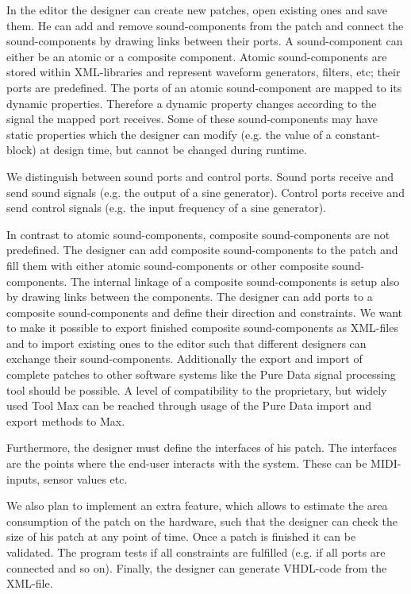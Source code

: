 In the editor the designer can create new patches, open existing ones and save them.
He can add and remove sound-components from the patch and connect the sound-components by drawing links between their ports.
A sound-component can either be an atomic or a composite component. 
Atomic sound-components are stored within XML-libraries and represent waveform generators, filters, etc; their ports are predefined. 
The ports of an atomic sound-component are mapped to its dynamic properties. Therefore a dynamic property changes according to the signal the mapped port receives.  
Some of these sound-components may have static properties which the designer can modify (e.g. the value of a constant-block) at design time, but cannot be changed during runtime. 

We distinguish between sound ports and control ports. Sound ports receive and send sound signals (e.g. the output of a sine generator). Control ports receive and send control signals (e.g. the input frequency of a sine generator).

In contrast to atomic sound-components, composite sound-components are not predefined. 
The designer can add composite sound-components to the patch and fill them with either atomic sound-components or other composite sound-components. The internal linkage of a composite sound-components is setup also by drawing links between the components.
The designer can add ports to a composite sound-components and define their direction and constraints. 
We want to make it possible to export finished composite sound-components as XML-files and to import existing ones to the editor such that different designers can exchange their sound-components. Additionally the export and import of complete patches to other software systems like the Pure Data signal processing tool should be possible. A level of compatibility to the proprietary, but widely used Tool Max can be reached through usage of the Pure Data import and export methods to Max.

Furthermore, the designer must define the interfaces of his patch. 
The interfaces are the points where the end-user interacts with the system. 
These can be MIDI-inputs, sensor values etc.

We also plan to implement an extra feature, which allows to estimate the area consumption of the patch on the hardware, such that the designer can check the size of his patch at any point of time. 
Once a patch is finished it can be validated. The program tests if all constraints are fulfilled (e.g. if all ports are connected and so on). Finally, the designer can generate VHDL-code from the XML-file.

